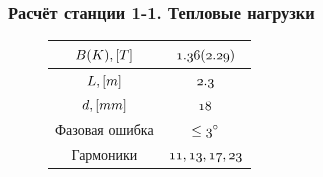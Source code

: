 \documentclass[14pt, hyperref = {colorlinks}]{beamer}
\begin{document}
\iffalse
\small
\begin{frame}
\frametitle{Расчёт станции 1-1. Тепловые нагрузки}\label{t1}
\vspace{-10pt}
\begin{figure}[h]
		\hspace{-20pt}
		\begin{minipage}[h]{0.49\linewidth}
			\tiny
			\vspace{-10pt}		
			\begin{table}[h]
				\begin{tabular}{c|c}
					\hline\hline
					\rule{0pt}{3ex}$\mathnormal{B(K), [T]}$   & $\mathnormal{1.36(2.29)}$   \\ \hline
					\rule{0pt}{3ex}$\mathnormal{L, [m]}$ 	  & $\mathnormal{2.3}$          \\ \hline
					\rule{0pt}{3ex}$\mathnormal{d, [mm]}$     & $\mathnormal{18}$    		\\ \hline
					\rule{0pt}{3ex}Фазовая ошибка             &$ \mathnormal{\leq 3^{\circ}}$  \\ \hline
					\rule{0pt}{3ex}Гармоники	              & $\mathnormal{11, 13, 17, 23}$  \\
					\hline\hline
				\end{tabular}
			\end{table}
		\vspace{-10pt}	
\end{minipage}
\begin{minipage}[h]{0.49\linewidth}

\end{minipage}
\end{figure}
\end{frame}
\end{document}
